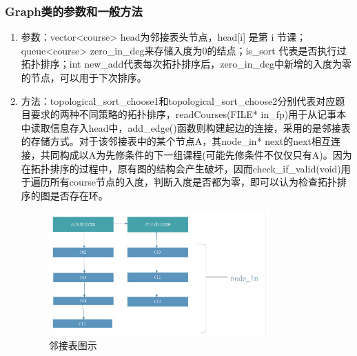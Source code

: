 \documentclass[a4,10pt]{article}
\begin{document}
        \subsubsection{Graph类的参数和一般方法}
\begin{enumerate}
\item{参数：vector<course> head为邻接表头节点，head[i] 是第 i 节课；queue<course> zero\_in\_deg来存储入度为0的结点；is\_sort 代表是否执行过拓扑排序；int new\_add代表每次拓扑排序后，zero\_in\_deg中新增的入度为零的节点，可以用于下次排序。}

\item{方法：topological\_sort\_choose1和topological\_sort\_choose2分别代表对应题目要求的两种不同策略的拓扑排序，readCourses(FILE* in\_fp)用于从记事本中读取信息存入head中，add\_edge()函数则构建起边的连接，采用的是邻接表的存储方式。对于该邻接表中的某个节点A，其node\_in* next的next相互连接，共同构成以A为先修条件的下一组课程(可能先修条件不仅仅只有A)。因为在拓扑排序的过程中，原有图的结构会产生破坏，因而check\_if\_valid(void)用于遍历所有course节点的入度，判断入度是否都为零，即可以认为检查拓扑排序的图是否存在环。}
\begin{figure}[h]
    \centering
    \includegraphics[width=0.8\textwidth]{6022.png}
    \caption{邻接表图示}
    \label{fig:show}
\end{figure}

\end{enumerate}
\end{document}
